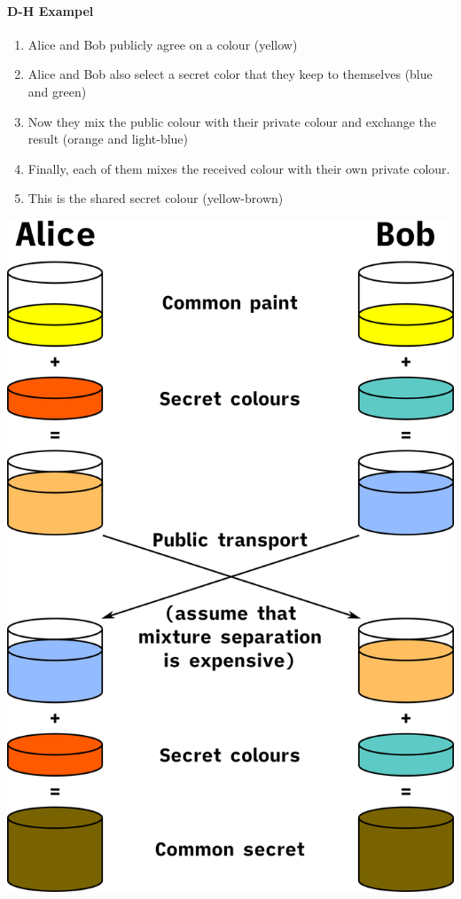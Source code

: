 \paragraph{D-H Exampel}
\begin{minipage}{0.69\linewidth}
  \begin{enumerate}
    \item Alice and Bob publicly agree on a colour (yellow)
    \item Alice and Bob also select a secret color that they keep to themselves (blue and green)
    \item Now they mix the public colour with their private colour and exchange the result (orange and light-blue)
    \item Finally, each of them mixes the received colour with their own private colour.
    \item This is the shared secret colour (yellow-brown)
  \end{enumerate}
\end{minipage}
\begin{minipage}{0.3\linewidth}
  \includegraphics[width=\linewidth]{images/EmbeddedSecurity/Diffie-Hellman_Key_Exchange.png}
\end{minipage}

